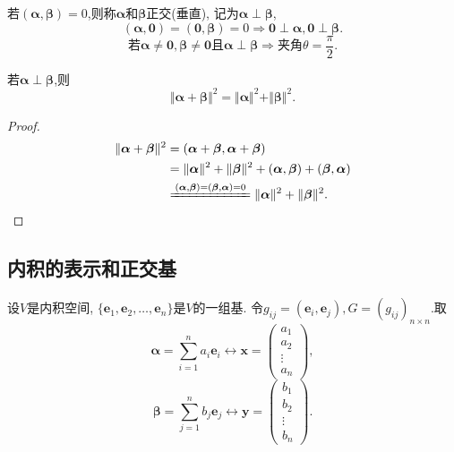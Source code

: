 \begin{definition}
  若$(\bm{\alpha},\bm{\beta})=0$,则称$\bm{\alpha}\text{和}\bm{\beta}$正交(垂直),
  记为$\bm{\alpha}\perp\bm{\beta}$,
  \[ (\bm{\alpha},\bm{0})=(\bm{0},\bm{\beta})=0 \Longrightarrow \bm{0}\perp \bm{\alpha}, \bm{0} \perp \bm{\beta}. \]
  \[ \text{若}\bm{\alpha}\neq \bm{0},\bm{\beta}\neq \bm{0}\text{且}
  \bm{\alpha}\perp\bm{\beta} \Longrightarrow \text{夹角}\theta = \frac{\pi}{2}. \]
\end{definition}

\begin{theorem}[勾股定理]
  若$\bm{\alpha}\perp\bm{\beta}$,则
  \[ \Vert\bm{\alpha}+\bm{\beta}\Vert^2=\Vert\bm{\alpha}\Vert^2+\Vert\bm{\beta}\Vert^2.  \]
\end{theorem}

\begin{proof}
  \begin{align*}
    \Vert\bm{\alpha}+\bm{\beta}\Vert^2 & = (\bm{\alpha}+\bm{\beta}, \bm{\alpha}+\bm{\beta})\\
                                       & = \Vert\bm{\alpha}\Vert^2+\Vert\bm{\beta}\Vert^2 + (\bm{\alpha},\bm{\beta})+(\bm{\beta},\bm{\alpha})\\
    & \xlongequal{(\bm{\alpha},\bm{\beta})=(\bm{\beta},\bm{\alpha})=0} \Vert\bm{\alpha}\Vert^2+\Vert\bm{\beta}\Vert^2.
  \end{align*}
\end{proof}

\subsection{内积的表示和正交基}

设$V$是内积空间, $\{\bm{e}_1, \bm{e}_2, \dots, \bm{e}_n\}$是$V$的一组基.
令$g_{ij}=(\bm{e}_i,\bm{e}_j), G=(g_{ij})_{n\times n}$.取
\[
  \bm{\alpha} = \sum_{i=1}^n a_i\bm{e}_i \longleftrightarrow \bm{x}= \begin{pmatrix}a_1\\a_2\\\vdots\\a_n\end{pmatrix},
  \]
\[
  \bm{\beta} = \sum_{j=1}^n b_j\bm{e}_j \longleftrightarrow \bm{y}= \begin{pmatrix}b_1\\b_2\\\vdots\\b_n\end{pmatrix}.
\]

